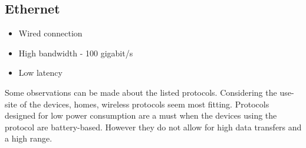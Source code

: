\subsection{Ethernet} \cite{wiki_ethernet}

\begin{itemize}
\item Wired connection
\item High bandwidth - 100 gigabit/s
\item Low latency
\end{itemize}

Some observations can be made about the listed protocols. Considering the
use-site of the devices, homes, wireless protocols seem most fitting. Protocols
designed for low power consumption are a must when the devices using the
protocol are battery-based. However they do not allow for high data transfers
and a high range.
